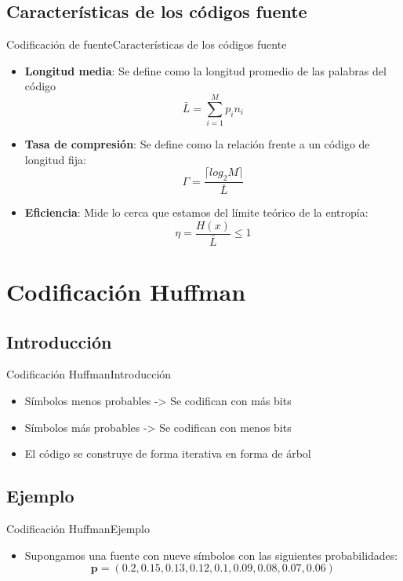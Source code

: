 \documentclass[10pt,compress]{beamer} %
\begin{document}
\subsection{Características de los códigos fuente}
\begin{frame}{Codificación de fuente}{Características de los códigos fuente}
  \begin{itemize}
    \item {\bf Longitud media}: Se define como la longitud promedio de las palabras del código
    \begin{displaymath}
      \bar{L} = \sum_{i=1}^M p_i n_i	
    \end{displaymath}
    \item {\bf Tasa de compresión}: Se define como la relación frente a un código de longitud fija:
    \begin{displaymath}
      \Gamma = \frac{\lceil log_2 M \rceil}{\bar{L}}	
    \end{displaymath}
    \item {\bf Eficiencia}: Mide lo cerca que estamos del límite teórico de la entropía:
    \begin{displaymath}
      \eta = \frac{H(x)}{\bar{L}} \leq 1	
    \end{displaymath}
  \end{itemize}
\end{frame}


\section{Codificación Huffman}
\subsection{Introducción}

\begin{frame}{Codificación Huffman}{Introducción}
  \begin{itemize}
    \item Símbolos menos probables -> Se codifican con más bits
    \item Símbolos más probables -> Se codifican con menos bits
    \item El código se construye de forma iterativa en forma de árbol
  \end{itemize}
\end{frame}

\subsection{Ejemplo}
\begin{frame}{Codificación Huffman}{Ejemplo}
  \begin{itemize}
    \item Supongamos una fuente con nueve símbolos con las siguientes probabilidades:
    \begin{displaymath}
      \mathbf{p} = (0.2, 0.15, 0.13, 0.12, 0.1, 0.09, 0.08, 0.07, 0.06)
    \end{displaymath}
  \end{itemize}
\end{frame}
\end{document}
